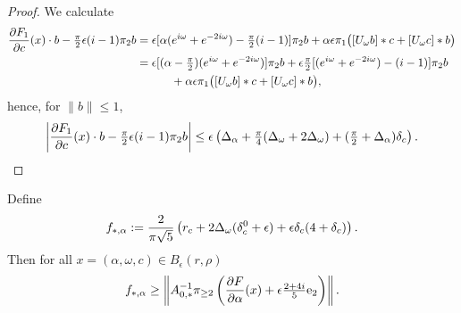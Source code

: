 \begin{proof}
	We calculate
\begin{alignat*}{1}
		\frac{\partial F_1 }{\partial c } (x) \cdot b -  \tfrac{\pi}{2} \epsilon (i-1) \pi_2 b 
	& =
	\epsilon [ \alpha (e^{i \omega} + e^{-2i \omega})  - \tfrac{\pi}{2}(i -1)] \pi_2 b 
	+ \alpha \epsilon  \pi_1 \bigl(  [ U_{\omega} b ] * c + [ U_{\omega} c ]*b \bigr)  \\
	&= \epsilon [ (\alpha - \tfrac{\pi}{2}) (e^{i \omega} + e^{-2i \omega})  ]  \pi_2 b  +
	\epsilon  \tfrac{\pi}{2} [  (e^{i \omega} + e^{-2i \omega})  - (i -1)]  \pi_2 b  \nonumber \\
	& \qquad\quad + \alpha \epsilon \pi_1 \bigl(  [ U_{\omega} b ] * c + [ U_{\omega} c ]*b \bigr)  ,
	\end{alignat*}
hence, for $\|b\| \leq 1$,
\begin{equation*}
	\left| 
	\frac{\partial F_1 }{\partial c } (x) \cdot b -  \tfrac{\pi}{2} \epsilon (i-1) \pi_2 b 
	\right| 
	\leq
  \epsilon \left(  \Delta_\alpha + \tfrac{\pi}{4}(\Delta_\omega + 2 \Delta_\omega ) +  (\tfrac{\pi}{2} + \Delta_\alpha )  \delta_c   \right)  .
	\end{equation*}
\end{proof}





\begin{proposition}
		\label{prop:Zsa}
Define  
		\[
		f_{*,\alpha} := \frac{2}{\pi \sqrt{5}}\left( r_c +  2 \Delta_\omega (  \delta_c^0 +  \epsilon )  + \epsilon \delta_c (4 + \delta_c )  \right)  .
		\]
	Then for all $x= (\alpha,\omega,c) \in B_\epsilon(r,\rho)$
	\[
		f_{*,\alpha} \geq  \left\| A_{0,*}^{-1} \pi_{\geq 2} \left(
		\frac{\partial F}{\partial \alpha}(x)  +   \epsilon  \tfrac{2 +4 i}{5}  \mathrm{e}_2  \right) \right\|  .
	\]
\end{proposition}

